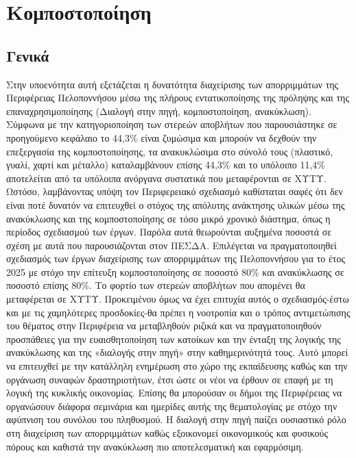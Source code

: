 \documentclass[12pt]{article}
\begin{document}
 	\section{Κομποστοποίηση}
 	
 	\subsection{Γενικά}
 	
 	Στην  υποενότητα αυτή εξετάζεται η δυνατότητα διαχείρισης των απορριμμάτων της Περιφέρειας Πελοποννήσου μέσω της πλήρους εντατικοποίησης της πρόληψης και της επαναχρησιμοποίησης (Διαλογή στην πηγή, κομποστοποίηση, ανακύκλωση). Σύμφωνα με την κατηγοριοποίηση των στερεών αποβλήτων που παρουσιάστηκε σε προηγούμενο κεφάλαιο το 44,3\% είναι ζυμώσιμα και μπορούν να δεχθούν την επεξεργασία της κομποστοποίησης, τα ανακυκλώσιμα στο σύνολό τους (πλαστικό, γυαλί, χαρτί και μέταλλο) καταλαμβάνουν επίσης 44,3\% και το υπόλοιπο 11,4\% αποτελείται από τα υπόλοιπα ανόργανα συστατικά που μεταφέρονται σε ΧΥΤΥ. Ωστόσο, λαμβάνοντας υπόψη τον Περιφερειακό σχεδιασμό καθίσταται σαφές ότι δεν είναι ποτέ δυνατόν να επιτευχθεί ο στόχος της απόλυτης ανάκτησης υλικών μέσω της ανακύκλωσης και της κομποστοποίησης σε τόσο μικρό χρονικό διάστημα, όπως η περίοδος σχεδιασμού των έργων. Παρόλα αυτά θεωρούνται αυξημένα ποσοστά σε σχέση με αυτά που παρουσιάζονται στον ΠΕΣΔΑ. Επιλέγεται να πραγματοποιηθεί σχεδιασμός των έργων διαχείρισης των απορριμμάτων της Πελοποννήσου για το έτος 2025 με στόχο την επίτευξη κομποστοποίησης σε ποσοστό 80\% και ανακύκλωσης σε ποσοστό επίσης 80\%. Το φορτίο των στερεών αποβλήτων που απομένει θα μεταφέρεται σε ΧΥΤΥ. Προκειμένου όμως να έχει επιτυχία αυτός ο σχεδιασμός-έστω και με τις χαμηλότερες προσδοκίες-θα πρέπει η νοοτροπία και ο τρόπος αντιμετώπισης του θέματος στην Περιφέρεια να μεταβληθούν ριζικά και να πραγματοποιηθούν προσπάθειες για την ευαισθητοποίηση των κατοίκων και την ένταξη της λογικής της ανακύκλωσης και της «διαλογής στην πηγή» στην καθημερινότητά τους. Αυτό μπορεί να επιτευχθεί με την κατάλληλη ενημέρωση στο χώρο της εκπαίδευσης καθώς και την οργάνωση συναφών δραστηριοτήτων, έτσι ώστε οι νέοι να έρθουν σε επαφή με τη λογική της κυκλικής οικονομίας. Επίσης θα μπορούσαν οι δήμοι της Περιφέρειας να οργανώσουν διάφορα σεμινάρια και ημερίδες αυτής της θεματολογίας με στόχο την αφύπνιση του συνόλου του πληθυσμού. Η διαλογή στην πηγή παίζει ουσιαστικό ρόλο στη διαχείριση των απορριμμάτων καθώς εξοικονομεί οικονομικούς και φυσικούς πόρους και καθιστά την ανακύκλωση πιο αποτελεσματική και εφαρμόσιμη.
 	
\end{document}

